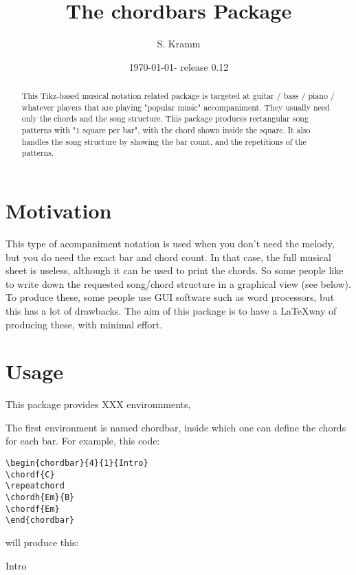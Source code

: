 \documentclass[11pt]{article}
\title{The chordbars Package}
\author{S. Kramm}
\date{\today - release 0.12}
\begin{document}
\maketitle

\begin{abstract}
This Tikz-based musical notation related package is targeted at guitar / bass / piano / whatever players that are playing "popular music" accompaniment.
They usually need only the chords and the song structure.
This package produces rectangular song patterns with "1 square per bar", with the chord shown inside the square.
It also handles the song structure by showing the bar count, and the repetitions of the patterns.
\end{abstract}

\section{Motivation}

This type of acompaniment notation is used when you don't need the melody, but you do need the exact bar and chord count.
In that case, the full musical sheet is useless, although it can be used to print the chords.
So some people like to write down the requested song/chord structure in a graphical view (see below). To produce these, some people use GUI software such as word processors, but this has a lot of drawbacks.
The aim of this package is to have a \LaTeX way of producing these, with minimal effort.


\section{Usage}
This package provides XXX environnments,

The first environment is named {\ttfamily chordbar}, inside which one can define the chords for each bar.
For example, this code:

\begin{lstlisting}
\begin{chordbar}{4}{1}{Intro}
\chordf{C}
\repeatchord
\chordh{Em}{B}
\chordf{Em}
\end{chordbar}
\end{lstlisting}

will produce this:

\begin{chordbar}{4}{1}{Intro}
\repeatchord
{}
\end{chordbar}
\end{document}
